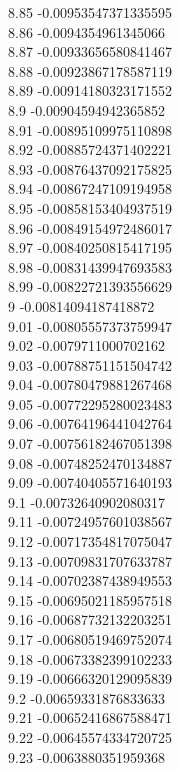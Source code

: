 {8.85	-0.00953547371335595\\
8.86	-0.0094354961345066\\
8.87	-0.00933656580841467\\
8.88	-0.00923867178587119\\
8.89	-0.00914180323171552\\
8.9	-0.00904594942365852\\
8.91	-0.00895109975110898\\
8.92	-0.00885724371402221\\
8.93	-0.00876437092175825\\
8.94	-0.00867247109194958\\
8.95	-0.00858153404937519\\
8.96	-0.00849154972486017\\
8.97	-0.00840250815417195\\
8.98	-0.00831439947693583\\
8.99	-0.00822721393556629\\
9	-0.00814094187418872\\
9.01	-0.00805557373759947\\
9.02	-0.0079711000702162\\
9.03	-0.00788751151504742\\
9.04	-0.00780479881267468\\
9.05	-0.00772295280023483\\
9.06	-0.00764196441042764\\
9.07	-0.00756182467051398\\
9.08	-0.00748252470134887\\
9.09	-0.00740405571640193\\
9.1	-0.00732640902080317\\
9.11	-0.00724957601038567\\
9.12	-0.00717354817075047\\
9.13	-0.00709831707633787\\
9.14	-0.00702387438949553\\
9.15	-0.00695021185957518\\
9.16	-0.00687732132203251\\
9.17	-0.00680519469752074\\
9.18	-0.00673382399102233\\
9.19	-0.00666320129095839\\
9.2	-0.00659331876833633\\
9.21	-0.00652416867588471\\
9.22	-0.00645574334720725\\
9.23	-0.0063880351959368\\
}

